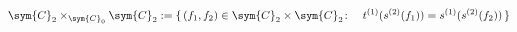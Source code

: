 \begin{equation}
  \sym{C}_2\times_{\sym{C}_0}\sym{C}_2:=\{\,(f_1,f_2)\in\sym{C}_2\times\sym{C}_2
    \colon\quad t^{(1)}(s^{(2)}(f_1))=s^{(1)}(s^{(2)}(f_2))\,\}
\end{equation}

